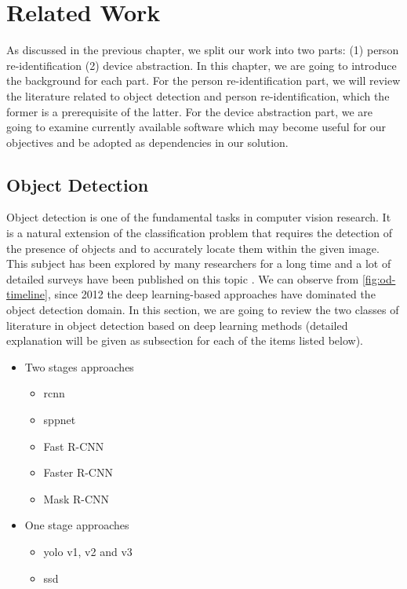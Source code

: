 \chapter{Related Work}
\label{chap:RelatedWork}


As discussed in the previous chapter, we split our work into two parts:
(1) person re-identification (2) device abstraction.
In this chapter, we are going to introduce the background for each part. For the
person re-identification part, we will review the literature related to object
detection and person re-identification, which the former is a prerequisite of
the latter. For the device abstraction part, we are going to examine currently
available software which may become useful for our objectives and be adopted as
dependencies in our solution.


\section{Object Detection}
\label{sec:related_work_obj_det}

Object detection is one of the fundamental tasks in computer vision research.
It is a natural extension of the classification problem that requires the 
detection of
the presence of objects and to accurately locate them within the given image.
This subject has been explored by many researchers for a long time and a lot of
detailed surveys have been published on this topic
\cite{survey2-on-dl-od-2018, survey1-on-dl-od-2018}.
We can observe from \autoref{fig:od-timeline}, since 2012 the deep
learning-based approaches have dominated the object detection domain.
In this section, we are going to review the two classes of literature in object
detection based on deep learning methods (detailed explanation will be given as
subsection for each of the items listed below).

\pagebreak

\begin{itemize}
    \item Two stages approaches
    \begin{itemize}
        \item \acrshort{rcnn}
        \item \acrshort{sppnet}
        \item Fast R-CNN
        \item Faster R-CNN
        \item Mask R-CNN
    \end{itemize}

    \item One stage approaches
    \begin{itemize}
        \item \acrshort{yolo} v1, v2 and v3
        \item \acrshort{ssd}
    \end{itemize}
\end{itemize}

